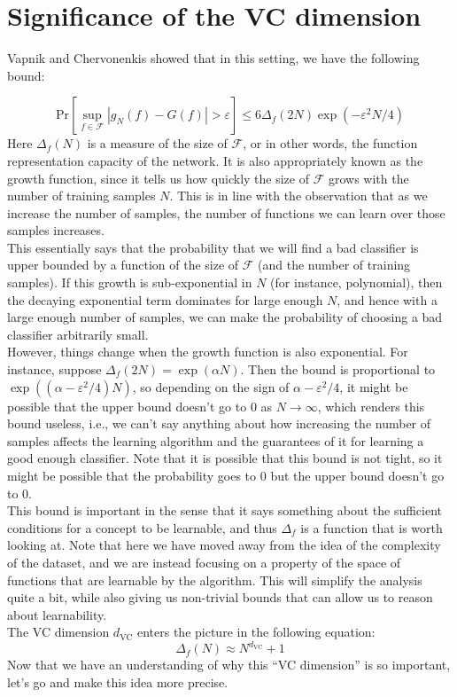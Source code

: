 \documentclass[11pt]{article}
\newcommand{\nl}{\vspace*{0.3cm}\\}
\begin{document}
\section{Significance of the VC dimension}

Vapnik and Chervonenkis showed that in this setting, we have the following bound:

\[
\mathrm{Pr}[\sup_{f \in \mathcal{F}}|g_N(f) - G(f)| > \varepsilon] \le 6 \Delta_f(2N) \exp(-\varepsilon^2 N / 4)
\]
Here $\Delta_f(N)$ is a measure of the size of $\mathcal{F}$, or in other words, the function representation capacity of the network. It is also appropriately known as the growth function, since
it tells us how quickly the size of $\mathcal{F}$ grows with the number of training samples $N$. This is in line with the observation that as we increase the number of samples, the number of
functions we can learn over those samples increases.\nl
This essentially says that the probability that we will find a bad classifier is upper bounded by a function of the size of $\mathcal{F}$ (and the number of training samples). If this growth is
sub-exponential in $N$ (for instance, polynomial), then the decaying exponential term dominates for large enough $N$, and hence with a large enough number of samples, we can make the probability of choosing a bad classifier arbitrarily
small.\nl
However, things change when the growth function is also exponential. For instance, suppose $\Delta_f(2N) = \exp(\alpha N)$. Then the bound is proportional to $\exp((\alpha -
\varepsilon^2/4) N)$, so depending on the sign of $\alpha - \varepsilon^2 / 4$, it might be possible that the upper bound doesn't go to $0$ as $N \to \infty$, which renders this bound useless,
i.e., we can't say anything about how increasing the number of samples affects the learning algorithm and the guarantees of it for learning a good enough classifier.
Note that it is possible that this bound is not tight, so it might be possible that the probability goes to $0$ but the upper bound doesn't go to $0$.\nl
This bound is important in the sense that it says something about the sufficient conditions for a concept to be learnable, and thus $\Delta_f$ is a function that is worth looking at. Note that
here we have moved away from the idea of the complexity of the dataset, and we are instead focusing on a property of the space of functions that are learnable by the algorithm. This will simplify the
analysis quite a bit, while also giving us non-trivial bounds that can allow us to reason about learnability.\nl
The VC dimension $d_{\text{VC}}$ enters the picture in the following equation:
\[
    \Delta_f(N) \approx N^{d_{\text{VC}}} + 1
\]
Now that we have an understanding of why this ``VC dimension'' is so important, let's go and make this idea more precise.
\end{document}
